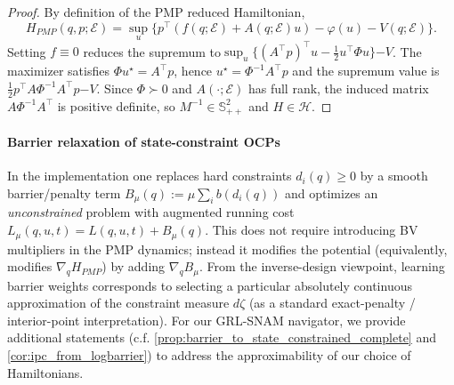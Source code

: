 \begin{proof}
By definition of the PMP reduced Hamiltonian,
\[
H_{PMP}(q,p;\mathcal E)=\sup_{u}\Big\{p^\top(f(q;\mathcal E)+A(q;\mathcal E)u)-\varphi(u)- V(q;\mathcal E)\Big\}.
\]
Setting $f\equiv 0$ reduces the supremum to$\sup_u\{(A^\top p)^\top u-\tfrac12 u^\top \Phi u\}{-V}$.
The maximizer satisfies $\Phi u^\star=A^\top p$, hence $u^\star=\Phi^{-1}A^\top p$ and the supremum value is
$\tfrac12 p^\top A\Phi^{-1}A^\top p { - V}$. Since $\Phi\succ 0$ and $A(\cdot;\mathcal E)$ has full rank, the induced
matrix $A\Phi^{-1}A^\top$ is positive definite, so $M^{-1}\in\mathbb S_{++}^2$ and $H\in\mathscr H$.
\end{proof}
{
\paragraph{Barrier relaxation of state-constraint OCPs}\label{rem:barrier_relaxation}
In the implementation one replaces hard constraints $d_i(q)\ge 0$ by a smooth barrier/penalty term
$B_\mu(q):=\mu \sum_i b(d_i(q))$ and optimizes an \emph{unconstrained} problem with augmented running cost
$L_\mu(q,u,t)=L(q,u,t)+B_\mu(q)$.
This does not require introducing BV multipliers in the PMP dynamics; instead it modifies the potential (equivalently, modifies $\nabla_q H_{PMP}$) by adding $\nabla_q B_\mu$. From the inverse-design viewpoint, learning barrier weights corresponds to selecting a particular absolutely continuous approximation of the constraint measure $d\zeta$ (as a standard exact-penalty / interior-point interpretation). For our GRL-SNAM navigator, we provide additional statements (c.f. \cref{prop:barrier_to_state_constrained_complete} and \cref{cor:ipc_from_logbarrier}) to address the approximability of our choice of Hamiltonians.
}

